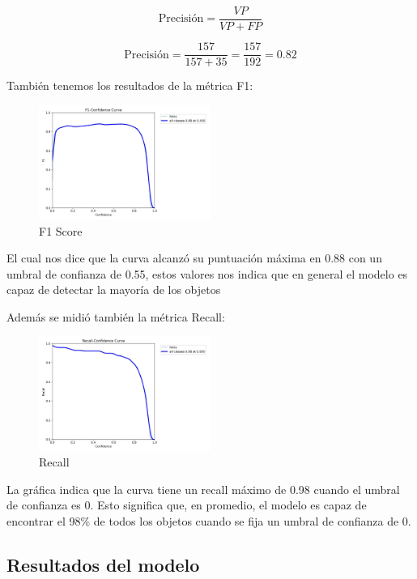 \documentclass[14pt]{extarticle}
\begin{document}
\[
\text{Precisión} = \frac{VP}{VP + FP}
\]

\[
\text{Precisión} = \frac{157}{157 + 35} = \frac{157}{192} = 0.82
\]

También tenemos los resultados de la métrica F1:

\begin{figure}[h]
    \centering
    \includegraphics[width=0.5\textwidth]{./images/photo_2025-01-31_02-27-43.jpg}
    \caption{F1 Score}
    \label{fig:f1}
\end{figure}

El cual nos dice que la curva alcanzó su puntuación máxima en 0.88 con un umbral de confianza de 0.55, estos valores nos indica que en general el modelo es capaz de detectar la mayoría de los objetos

Además se midió también la métrica Recall:

\begin{figure}[h]
    \centering
    \includegraphics[width=0.5\textwidth]{./images/photo_2025-01-31_02-27-21.jpg}
    \caption{Recall}
    \label{fig:recall}
\end{figure}

La gráfica indica que la curva tiene un recall máximo de 0.98 cuando el umbral de confianza es 0. Esto significa que, en promedio, el modelo es capaz de encontrar el 98\% de todos los objetos cuando se fija un umbral de confianza de 0.

\subsection{Resultados del modelo}
\end{document}
